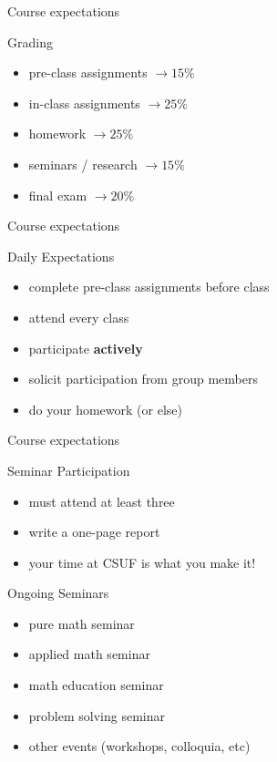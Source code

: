 \documentclass{beamer}
\begin{document}
\begin{frame}{Course expectations}
\pause
  \begin{block}{Grading}
    \begin{itemize}
\pause
      \item pre-class assignments $\rightarrow 15\%$
\pause
      \item in-class assignments $\rightarrow 25\%$ 
\pause
      \item homework $\rightarrow 25\%$ 
\pause
      \item seminars / research $\rightarrow 15\%$ 
\pause
      \item final exam $\rightarrow 20\%$ 
    \end{itemize}
  \end{block}
\end{frame}

\begin{frame}{Course expectations}
\pause
  \begin{block}{Daily Expectations}
    \begin{itemize}
\pause
      \item complete pre-class assignments before class
\pause
      \item attend every class 
\pause
      \item participate \textbf{actively}
\pause
      \item solicit participation from group members
\pause
      \item do your homework (or else)
    \end{itemize}
  \end{block}
\end{frame}

\begin{frame}{Course expectations}
\pause
  \begin{block}{Seminar Participation}
    \begin{itemize}
\pause
      \item must attend at least three
\pause
      \item write a one-page report
\pause
      \item your time at CSUF is what you make it!
    \end{itemize}
  \end{block}
\pause
  \begin{block}{Ongoing Seminars}
    \begin{itemize}
\pause
      \item pure math seminar
\pause
      \item applied math seminar
\pause
      \item math education seminar
\pause
      \item problem solving seminar
\pause
      \item other events (workshops, colloquia, etc)
    \end{itemize}
  \end{block}
\end{frame}
\end{document}
